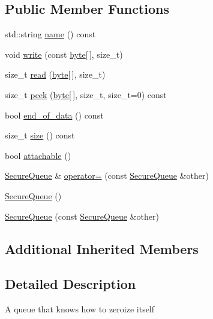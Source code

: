\subsection*{Public Member Functions}
\begin{DoxyCompactItemize}
\item 
std\-::string \hyperlink{classBotan_1_1SecureQueue_a92bcc269d9e52f3a4cf3af50a4752202}{name} () const 
\item 
void \hyperlink{classBotan_1_1SecureQueue_ad535dcaf36beb0549bf5d2ad527d45bb}{write} (const \hyperlink{namespaceBotan_a7d793989d801281df48c6b19616b8b84}{byte}\mbox{[}$\,$\mbox{]}, size\-\_\-t)
\item 
size\-\_\-t \hyperlink{classBotan_1_1SecureQueue_a6550ac320d5153aad0706d2d398529d1}{read} (\hyperlink{namespaceBotan_a7d793989d801281df48c6b19616b8b84}{byte}\mbox{[}$\,$\mbox{]}, size\-\_\-t)
\item 
size\-\_\-t \hyperlink{classBotan_1_1SecureQueue_a3c2157e2cc5fc90266748ff5f9959414}{peek} (\hyperlink{namespaceBotan_a7d793989d801281df48c6b19616b8b84}{byte}\mbox{[}$\,$\mbox{]}, size\-\_\-t, size\-\_\-t=0) const 
\item 
bool \hyperlink{classBotan_1_1SecureQueue_a6fbd6c2b8ceecfde5d37162697c7130b}{end\-\_\-of\-\_\-data} () const 
\item 
size\-\_\-t \hyperlink{classBotan_1_1SecureQueue_a6161eef4f81908854f39fd740a9dd480}{size} () const 
\item 
bool \hyperlink{classBotan_1_1SecureQueue_aecb27eaaba310424907963d1d735253d}{attachable} ()
\item 
\hyperlink{classBotan_1_1SecureQueue}{Secure\-Queue} \& \hyperlink{classBotan_1_1SecureQueue_a0e31cc7d82ad8790b890fc555f5b1c58}{operator=} (const \hyperlink{classBotan_1_1SecureQueue}{Secure\-Queue} \&other)
\item 
\hyperlink{classBotan_1_1SecureQueue_a6fcc85284ce66e37803778762ee4c4ee}{Secure\-Queue} ()
\item 
\hyperlink{classBotan_1_1SecureQueue_a5586439c42151df55bdf5879394ffd05}{Secure\-Queue} (const \hyperlink{classBotan_1_1SecureQueue}{Secure\-Queue} \&other)
\end{DoxyCompactItemize}
\subsection*{Additional Inherited Members}


\subsection{Detailed Description}
A queue that knows how to zeroize itself 

